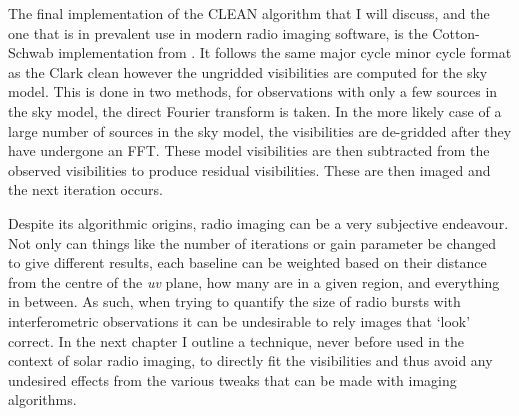 The final implementation of the CLEAN algorithm that I will discuss, and the one that is in prevalent use in modern radio imaging software, is the Cotton-Schwab implementation from \cite{Schwab1984}. It follows the same major cycle minor cycle format as the Clark clean however the ungridded visibilities are computed for the sky model. This is done in two methods, for observations with only a few sources in the sky model, the direct Fourier transform is taken. In the more likely case of a large number of sources in the sky model, the visibilities are de-gridded after they have undergone an FFT. These model visibilities are then subtracted from the observed visibilities to produce residual visibilities. These are then imaged and the next iteration occurs.

Despite its algorithmic origins, radio imaging can be a very subjective endeavour. Not only can things like the number of iterations or gain parameter be changed to give different results, each baseline can be weighted based on their distance from the centre of the \textit{uv} plane, how many are in a given region, and everything in between. As such, when trying to quantify the size of radio bursts with interferometric observations it can be undesirable to rely images that `look' correct. In the next chapter I outline a technique, never before used in the context of solar radio imaging, to directly fit the visibilities and thus avoid any undesired effects from the various tweaks that can be made with imaging algorithms.
